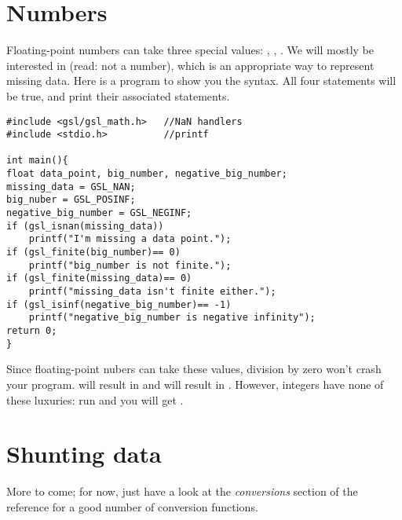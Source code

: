 \section{Numbers}      
Floating-point numbers can take three special values: , , . We will mostly be
interested in  (read: not a number), which is an appropriate way to represent missing data. Here is a
program to show you the syntax. All four  statements will be true, and print their associated
statements.
\begin{lstlisting}
#include <gsl/gsl_math.h>   //NaN handlers
#include <stdio.h>          //printf

int main(){
float data_point, big_number, negative_big_number;
missing_data = GSL_NAN;
big_nuber = GSL_POSINF;
negative_big_number = GSL_NEGINF;
if (gsl_isnan(missing_data))
    printf("I'm missing a data point.");
if (gsl_finite(big_number)== 0)
    printf("big_number is not finite.");
if (gsl_finite(missing_data)== 0)
    printf("missing_data isn't finite either.");
if (gsl_isinf(negative_big_number)== -1)
    printf("negative_big_number is negative infinity");
return 0;
}
\end{lstlisting}
Since floating-point nubers can take these values, division by zero
won't crash your program.  will result in
 and  will result in . However, integers have none of these luxuries: run  and you will get .


\section{Shunting data} \label{asst_conversions}  

More to come; for now, just have a look at the {\sl conversions} section
of the reference for a good number of conversion functions.

